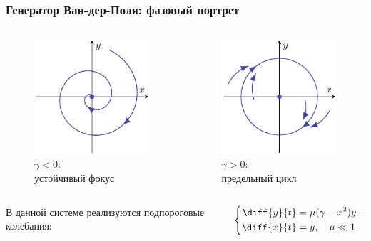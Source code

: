 \begin{frame}[t]
	\frametitle{Генератор Ван-дер-Поля: фазовый портрет}
	\vspace{-1em}
	\begin{columns}
		\begin{column}{0.49\textwidth}
			\begin{figure}[h]
				\centering
				\includegraphics[scale=0.99]{img/img_2a}
				\caption{$\gamma<0$:\\ устойчивый фокус}
			\end{figure}
		\end{column}
		\begin{column}{0.49\textwidth}
			\begin{figure}[h]
				\centering
				\includegraphics[scale=0.99]{img/img_2b}
				\caption{$\gamma>0$:\\ предельный цикл}
			\end{figure}
		\end{column}
	\end{columns}	
	\begin{columns}[c]
		\begin{column}{0.49\textwidth}
		\centering
		В данной системе реализуются подпороговые колебания:
		\end{column}
		\begin{column}{0.49\textwidth}
	\begin{equation*}
		\left\{
		\begin{aligned}
			\diff{y}{t} & =\mu(\gamma-x^2)y-\omega^2x\\%
			\diff{x}{t}  &=y, \quad \mu \ll 1
		\end{aligned}
		\right.
	\end{equation*}		
		\end{column}
	\end{columns}	
\end{frame}
